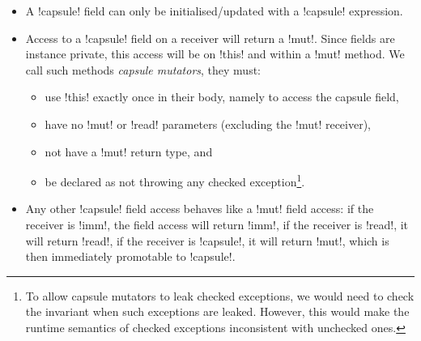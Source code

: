 \begin{itemize}
	\item A \Q!capsule! field can only be initialised/updated with a \Q!capsule! expression.
	\item Access to a \Q!capsule! field on a \Q@mut@ receiver will return a \Q!mut!. Since fields are instance private, this access will be on \Q!this! and within a \Q!mut! method. We call such methods \emph{capsule mutators}, they must:
	\begin{itemize}
		\item use \Q!this! exactly once in their body, namely to access the capsule field,
		\item have no \Q!mut! or \Q!read! parameters (excluding the \Q!mut! receiver),
		\item not have a \Q!mut! return type, and
		\item be declared as not throwing any checked exception\footnote{To allow capsule mutators to leak checked exceptions, we would need to check the invariant when such exceptions are leaked. However, this would make the runtime semantics of checked exceptions inconsistent with unchecked ones.}.
	\end{itemize}	
	\item Any other \Q!capsule! field access behaves like a \Q!mut! field access: if the receiver is \Q!imm!, the field access will return \Q!imm!, if the receiver is \Q!read!, it will return \Q!read!, if the receiver is \Q!capsule!, it will return \Q!mut!, which is then immediately promotable to \Q!capsule!. %
	
\end{itemize}

